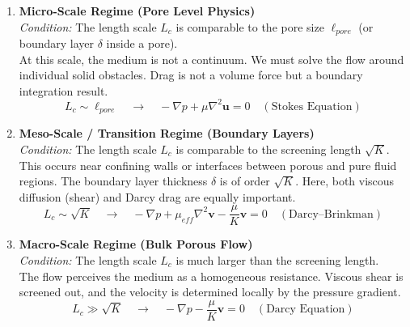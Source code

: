 \begin{enumerate}
    \item \textbf{Micro-Scale Regime (Pore Level Physics)} \\
    \textit{Condition:} The length scale $L_c$ is comparable to the pore size $\ell_{pore}$ (or boundary layer $\delta$ inside a pore). \\
    At this scale, the medium is not a continuum. We must solve the flow around individual solid obstacles. Drag is not a volume force but a boundary integration result.
    \begin{equation}
        L_c \sim \ell_{pore} \quad \xrightarrow{} \quad -\nabla p + \mu \nabla^2 \mathbf{u} = 0 \quad (\text{Stokes Equation})
    \end{equation}

    \item \textbf{Meso-Scale / Transition Regime (Boundary Layers)} \\
    \textit{Condition:} The length scale $L_c$ is comparable to the screening length $\sqrt{K}$. \\
    This occurs near confining walls or interfaces between porous and pure fluid regions. The boundary layer thickness $\delta$ is of order $\sqrt{K}$. Here, both viscous diffusion (shear) and Darcy drag are equally important.
    \begin{equation}
        L_c \sim \sqrt{K} \quad \xrightarrow{} \quad -\nabla p + \mu_{eff} \nabla^2 \mathbf{v} - \frac{\mu}{K} \mathbf{v} = 0 \quad (\text{Darcy--Brinkman})
    \end{equation}

    \item \textbf{Macro-Scale Regime (Bulk Porous Flow)} \\
    \textit{Condition:} The length scale $L_c$ is much larger than the screening length. \\
    The flow perceives the medium as a homogeneous resistance. Viscous shear is screened out, and the velocity is determined locally by the pressure gradient.
    \begin{equation}
        L_c \gg \sqrt{K} \quad \xrightarrow{} \quad -\nabla p - \frac{\mu}{K} \mathbf{v} = 0 \quad (\text{Darcy Equation})
    \end{equation}
\end{enumerate}


